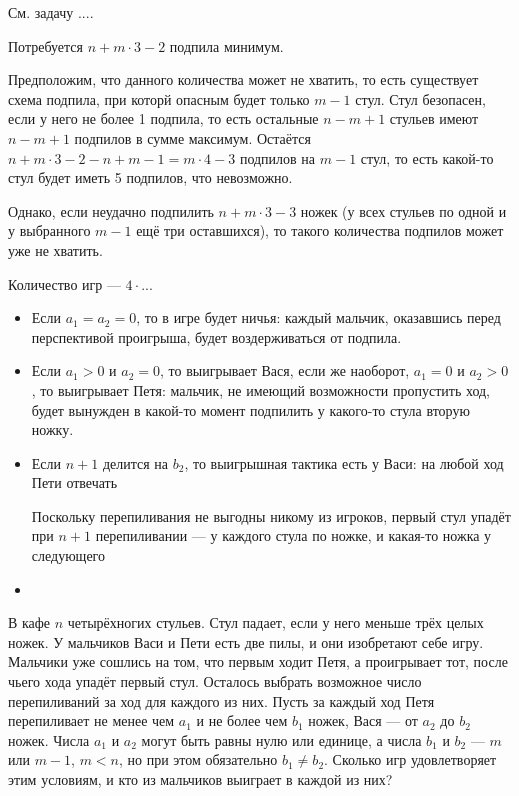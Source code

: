 \begin{itemize}
\itA См. задачу ....

\itB 


Потребуется $n + m \cdot 3 - 2$ подпила минимум.

Предположим, что данного количества может не хватить, то есть существует
схема подпила, при которй опасным будет только $m-1$ стул. 
Стул безопасен, если у него не более 1 подпила, 
то есть остальные $n-m+1$ стульев имеют $n-m+1$ подпилов в сумме максимум.
Остаётся $n + m \cdot 3 - 2 - n + m -1 = m \cdot 4 - 3$ подпилов на $m-1$ стул,
то есть какой-то стул будет иметь 5 подпилов, что невозможно.

Однако, если неудачно подпилить $n + m \cdot 3 - 3$ ножек (у всех стульев по
одной и у выбранного $m-1$ ещё три оставшихся), то такого количества
подпилов может уже не хватить.

\itC Количество игр --- $4 \cdot ...$

\begin{itemize}
\item Если $a_1 = a_2 = 0$, то в игре будет ничья:
каждый мальчик, оказавшись перед перспективой проигрыша, будет воздерживаться от подпила.

\item Если $a_1 > 0$ и $a_2 = 0$, то выигрывает Вася, если же наоборот, $a_1 = 0$ и $a_2 > 0$,
то выигрывает Петя: мальчик, не имеющий возможности пропустить ход, будет вынужден в какой-то
момент подпилить у какого-то стула вторую ножку.

\item Если $n+1$ делится на $b_2$, то выигрышная тактика есть у Васи:
на любой ход Пети отвечать 


Поскольку перепиливания не выгодны никому из игроков, первый стул упадёт при
$n+1$ перепиливании --- у каждого стула по ножке, и какая-то ножка у следующего

\item 
\end{itemize}

В кафе $n$ четырёхногих стульев. Стул падает, если у него меньше 
трёх целых ножек. У мальчиков Васи и Пети есть две пилы, и они изобретают 
себе игру. Мальчики уже сошлись на том, что первым ходит Петя, а проигрывает 
тот, после чьего хода упадёт первый стул. Осталось выбрать возможное число 
перепиливаний за ход для каждого из них. Пусть за каждый ход Петя 
перепиливает не менее чем $a_1$ и не более чем $b_1$ ножек, Вася — от $a_2$ до 
$b_2$ ножек. Числа $a_1$ и $a_2$ могут быть равны нулю или единице, а 
числа $b_1$ и $b_2$ — $m$ или $m-1$, $m<n$, но при этом обязательно $b_1 \ne b_2$. 
Сколько игр удовлетворяет этим условиям, и кто из мальчиков выиграет в каждой из них?
\end{itemize}
